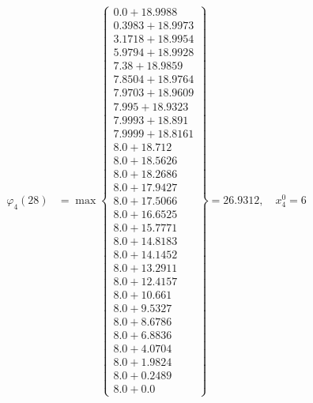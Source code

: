 \documentclass{article}
\begin{document}
\begin{align*}
\varphi_{4}(28) &= \max \left\{ \begin{array}{c}
0.0 + 18.9988 \\
 0.3983 + 18.9973 \\
 3.1718 + 18.9954 \\
 5.9794 + 18.9928 \\
 7.38 + 18.9859 \\
 7.8504 + 18.9764 \\
 7.9703 + 18.9609 \\
 7.995 + 18.9323 \\
 7.9993 + 18.891 \\
 7.9999 + 18.8161 \\
 8.0 + 18.712 \\
 8.0 + 18.5626 \\
 8.0 + 18.2686 \\
 8.0 + 17.9427 \\
 8.0 + 17.5066 \\
 8.0 + 16.6525 \\
 8.0 + 15.7771 \\
 8.0 + 14.8183 \\
 8.0 + 14.1452 \\
 8.0 + 13.2911 \\
 8.0 + 12.4157 \\
 8.0 + 10.661 \\
 8.0 + 9.5327 \\
 8.0 + 8.6786 \\
 8.0 + 6.8836 \\
 8.0 + 4.0704 \\
 8.0 + 1.9824 \\
 8.0 + 0.2489 \\
 8.0 + 0.0
\end{array} \right\}=26.9312, \quad x_{4}^0=6\\
  

\end{align*}
\end{document}
